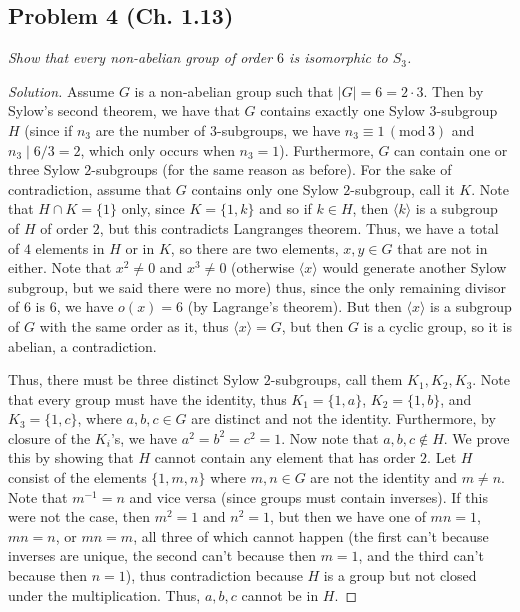 \documentclass{article}
\begin{document}
\subsection*{Problem 4 (Ch. 1.13)}
{\it Show that every non-abelian group of order $6$ is isomorphic to $S_3$.}
\begin{proof}[Solution]\let\qed\relax
	Assume $G$ is a non-abelian group such that $|G| = 6 = 2\cdot 3$.
	Then by Sylow's second theorem,
	we have that $G$ contains exactly one Sylow $3$-subgroup $H$
	(since if $n_3$ are the number of $3$-subgroups,
	we have $n_3 \equiv 1\,(\mathrm{mod}\,3)$ and $n_3 \mid 6/3 = 2$,
	which only occurs when $n_3 = 1$).
	Furthermore, $G$ can contain one or three Sylow $2$-subgroups
	(for the same reason as before).
	For the sake of contradiction,
	assume that $G$ contains only one Sylow $2$-subgroup, call it $K$.
	Note that $H \cap K = \{1\}$ only,
	since $K = \{1,k\}$ and so if $k \in H$, then $\langle k \rangle$
	is a subgroup of $H$ of order $2$, but this contradicts Langranges theorem.
	Thus, we have a total of $4$ elements in $H$ or in $K$,
	so there are two elements, $x,y \in G$ that are not in either.
	Note that $x^2 \neq 0$ and $x^3 \neq 0$ (otherwise $\langle x \rangle$
	would generate another Sylow subgroup, but we said there were no more)
	thus, since the only remaining divisor of $6$ is $6$,
	we have $o(x) = 6$ (by Lagrange's theorem).
	But then $\langle x \rangle$ is a subgroup of $G$ with the same order as it,
	thus $\langle x \rangle = G$, but then $G$ is a cyclic group,
	so it is abelian, a contradiction.

	Thus, there must be three distinct Sylow $2$-subgroups,
	call them $K_1, K_2, K_3$.
	Note that every group must have the identity,
	thus $K_1 = \{1,a\}$, $K_2 = \{1,b\}$, and $K_3 = \{1,c\}$,
	where $a,b,c \in G$ are distinct and not the identity.
	Furthermore, by closure of the $K_i$'s, we have $a^2 = b^2 = c^2 = 1$.
	Now note that $a,b,c \not\in H$.
	We prove this by showing that $H$ cannot contain any element
	that has order $2$.
	Let $H$ consist of the elements $\{1,m,n\}$ where $m,n \in G$
	are not the identity and $m \neq n$.
	Note that $m^{-1} = n$ and vice versa (since groups must contain inverses).
	If this were not the case, then $m^2 = 1$ and $n^2 = 1$,
	but then we have one of $mn = 1$, $mn = n$, or $mn = m$,
	all three of which cannot happen
	(the first can't because inverses are unique,
	the second can't because then $m = 1$,
	and the third can't because then $n = 1$),
	thus contradiction because $H$ is a group but not closed under the multiplication.
	Thus, $a,b,c$ cannot be in $H$.


\end{proof}
\end{document}

